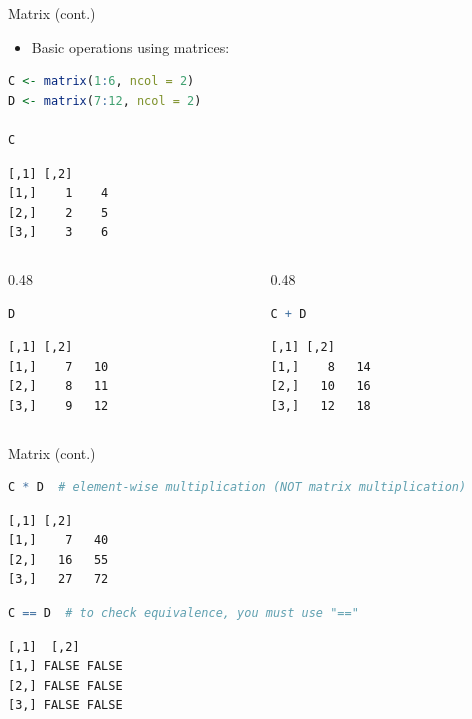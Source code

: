 \begin{frame}[fragile]{Matrix (cont.)}
\begin{itemize}
  \item Basic operations using matrices:
\end{itemize}
\begin{lstlisting}[language=R]
C <- matrix(1:6, ncol = 2)
D <- matrix(7:12, ncol = 2)

C
\end{lstlisting}
\begin{lstlisting}[style=output]
     [,1] [,2]
[1,]    1    4
[2,]    2    5
[3,]    3    6
\end{lstlisting}
\begin{columns}[T]
\begin{column}{0.48\textwidth}
\begin{lstlisting}[language=R]
D
\end{lstlisting}
\begin{lstlisting}[style=output]
     [,1] [,2]
[1,]    7   10
[2,]    8   11
[3,]    9   12
\end{lstlisting}
\end{column}
\begin{column}{0.48\textwidth}
\begin{lstlisting}[language=R]
C + D
\end{lstlisting}
\begin{lstlisting}[style=output]
     [,1] [,2]
[1,]    8   14
[2,]   10   16
[3,]   12   18
\end{lstlisting}
\end{column}
\end{columns}
\end{frame}

\begin{frame}[fragile]{Matrix (cont.)}
\begin{lstlisting}[language=R]
C * D  # element-wise multiplication (NOT matrix multiplication)
\end{lstlisting}
\begin{lstlisting}[style=output]
     [,1] [,2]
[1,]    7   40
[2,]   16   55
[3,]   27   72
\end{lstlisting}
\begin{lstlisting}[language=R]
C == D  # to check equivalence, you must use "=="
\end{lstlisting}
\begin{lstlisting}[style=output]
      [,1]  [,2]
[1,] FALSE FALSE
[2,] FALSE FALSE
[3,] FALSE FALSE
\end{lstlisting}
\end{frame}

